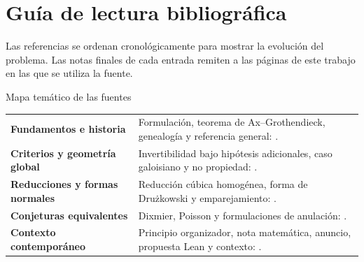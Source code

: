 \documentclass[11pt]{article}
\theoremstyle{definition}
\theoremstyle{remark}
\begin{document}
\clearpage
\section*{Gu\'ia de lectura bibliogr\'afica}

Las referencias se ordenan cronol\'ogicamente para mostrar la evoluci\'on del
problema. Las notas finales de cada entrada remiten a las p\'aginas de este
trabajo en las que se utiliza la fuente.

\begin{insightbox}{Mapa tem\'atico de las fuentes}
\renewcommand{\arraystretch}{1.28}
\begin{tabularx}{\textwidth}{@{}>{\raggedright\arraybackslash\sffamily\bfseries\color{deepblue}}p{}X@{}}
Fundamentos e historia &
Formulaci\'on, teorema de Ax--Grothendieck, genealog\'ia y referencia general:
\cite{Keller1939,Ax1968,VanDenEssen2000,RodriguezDiaz2026}.\\
\addlinespace[0.2em]
Criterios y geometr\'ia global &
Invertibilidad bajo hip\'otesis adicionales, caso galoisiano y no propiedad:
\cite{Campbell1973,Razar1979,Wang1980,Wright1981,Jelonek1993,Stacks0F2P}.\\
\addlinespace[0.2em]
Reducciones y formas normales &
Reducci\'on c\'ubica homog\'enea, forma de Dru\.zkowski y emparejamiento:
\cite{Yagzhev1980,BassConnellWright1982,Druzkowski1983,GorniZampieri1997}.\\
\addlinespace[0.2em]
Conjeturas equivalentes &
Dixmier, Poisson y formulaciones de anulaci\'on:
\cite{Zhao2004,BelovKanelKontsevich2007,AdjamagboVanDenEssen2007}.\\
\addlinespace[0.2em]
Contexto contempor\'aneo &
Principio organizador, nota matem\'atica, anuncio, propuesta Lean y contexto:
\cite{Xavier2026,CounterexampleNote2026,AlpogeAnnouncement2026,
LezeauLean2026,Buzzard2026}.\\
\end{tabularx}
\end{insightbox}
\end{document}
